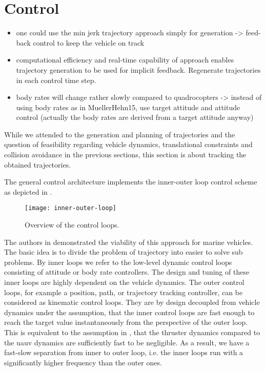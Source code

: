 \section{Control}
\label{sec:control}
\begin{itemize}
	\color{red}
	\item one could use the min jerk trajectory approach simply for generation -> feed-back control to keep the vehicle on track
	\item computational efficiency and real-time capability of approach enables trajectory generation to be used for implicit feedback. Regenerate trajectories in each control time step.
	\item body rates will change rather slowly compared to quadrocopters -> instead of using body rates as in MuellerHehn15, use target attitude and attitude control (actually the body rates are derived from a target attitude anyway)
\end{itemize}
While we attended to the generation and planning of trajectories and the question of feasibility regarding vehicle dynamics, translational constraints and collision avoidance in the previous sections, this section is about tracking the obtained trajectories.

The general control architecture implements the inner-outer loop control scheme as depicted in .
\begin{figure}
	\texttt{[image: inner-outer-loop]}
	\caption{Overview of the control loops.}
	\label{fig:inner-outer-loop-feedback-control}
\end{figure}
The authors in \cite{Maurya09} demonstrated the viability of this approach for marine vehicles. The basic idea is to divide the problem of trajectory into easier to solve sub problems. By inner loops we refer to the low-level dynamic control loops consisting of attitude or body rate controllers. The design and tuning of these inner loops are highly dependent on the vehicle dynamics. The outer control loops, for example a position, path, or trajectory tracking controller, can be considered as kinematic control loops. They are by design decoupled from vehicle dynamics under the assumption, that the inner control loops are fast enough to reach the target value instantaneously from the perspective of the outer loop. This is equivalent to the assumption in , that the thruster dynamics compared to the \ac{uauv} dynamics are sufficiently fast to be negligible. As a result, we have a fast-slow separation from inner to outer loop, i.e. the inner loops run with a significantly higher frequency than the outer ones.

